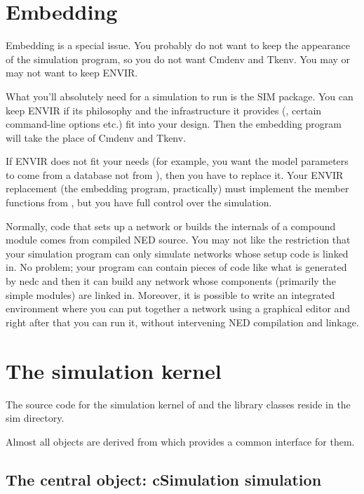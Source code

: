 \section{Embedding {\opp}}

Embedding is a special issue. You probably
do not want to keep the appearance of the simulation program, so you
do not want Cmdenv and Tkenv. You may or may not want to keep ENVIR.

What you'll absolutely need for a simulation to run is the SIM
package. You can keep ENVIR if its philosophy and the infrastructure
it provides (, certain command-line options etc.)
fit into your design. Then the embedding program will take the
place of Cmdenv and Tkenv.

If ENVIR does not fit your needs (for example, you want the model
parameters to come from a database not from ), then you
have to replace it. Your ENVIR replacement (the embedding program,
practically) must implement the  member functions from
, but you have full control over the simulation.

Normally, code that sets up a network or builds the internals of a
compound module comes from compiled NED source.  You may not like the
restriction that your simulation program can only simulate networks
whose setup code is linked in. No problem; your program can contain
pieces of code like what is generated by nedc and then it can build
any network whose components (primarily the simple modules) are linked
in. Moreover, it is possible to write an integrated environment where
you can put together a network using a graphical editor and right
after that you can run it, without intervening NED compilation and
linkage.





\section{The simulation kernel}

The source code for the simulation kernel of
{\opp} and the library classes reside in the sim directory.

Almost all objects are derived from  which
provides a common interface for them.





\subsection{The central object: cSimulation simulation}

